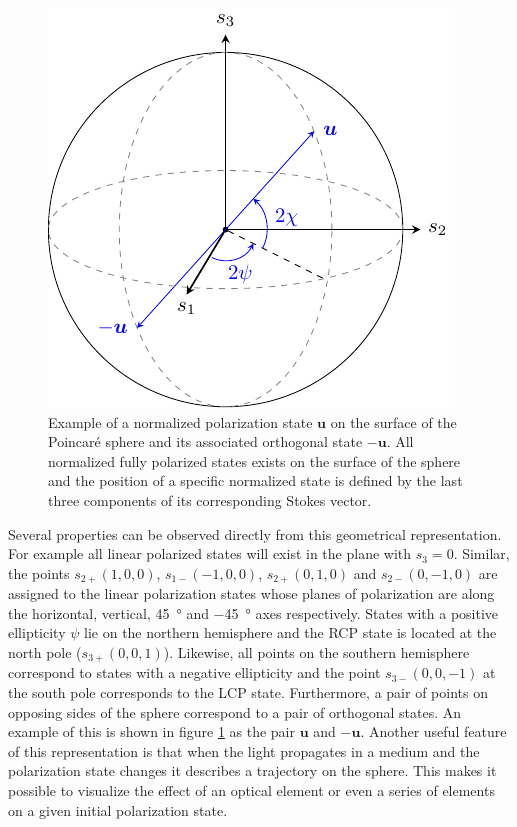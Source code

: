 \begin{figure}[h]
    \centering
    \includegraphics[scale=0.9]{images/theory/tikz_poincare_sphere_intro.pdf}
    \caption{Example of a normalized polarization state $\bm{u}$ on the surface of the Poincaré sphere and its associated orthogonal state $-\bm{u}$. All normalized fully polarized states exists on the surface of the sphere and the position of a specific normalized state is defined by the last three components of its corresponding Stokes vector.}
    \label{fig:poincare_sphere_intro}
\end{figure}

Several properties can be observed directly from this geometrical representation. For example all linear polarized states will exist in the plane with $s_3=0$. Similar, the points $s_{2+}(1,0,0)$, $s_{1-}(-1,0,0)$, $s_{2+}(0,1,0)$ and $s_{2-}(0,-1,0)$ are assigned to the linear polarization states whose planes of polarization are along the horizontal, vertical, \SI{+45}{\degree} and \SI{-45}{\degree} axes respectively. States with a positive ellipticity $\psi$ lie on the northern hemisphere and the RCP state is located at the north pole ($s_{3+}(0,0,1)$). Likewise, all points on the southern hemisphere correspond to states with a negative ellipticity and the point $s_{3-}(0,0,-1)$ at the south pole corresponds to the LCP state. Furthermore, a pair of points on opposing sides of the sphere correspond to a pair of orthogonal states. An example of this is shown in figure \ref{fig:poincare_sphere_intro} as the pair $\bm{u}$ and $-\bm{u}$. Another useful feature of this representation is that when the light propagates in a medium and the polarization state changes it describes a trajectory on the sphere. This makes it possible to visualize the effect of an optical element or even a series of elements on a given initial polarization state.

